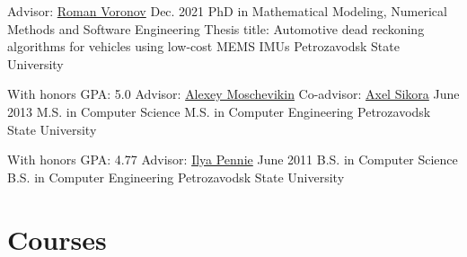 \documentclass{tccv}
\begin{document}
\begin{yearlist}

\item[Advisor: \href{https://petrsu.ru/persons/322/voronov}{Roman Voronov}]{Dec. 2021}
     {PhD \textnormal{in Mathematical Modeling, Numerical Methods and Software Engineering} \newline Thesis title: \textnormal{Automotive dead reckoning algorithms for vehicles using low-cost MEMS IMUs}}
     {Petrozavodsk State University}
     

\item[With honors \newline GPA: 5.0 \newline
      Advisor: \href{http://lab127.karelia.ru/~alexmou/resume_alexmou_eng.pdf}{Alexey Moschevikin} \newline
      Co-advisor: \href{https://ei.hs-offenburg.de/nc/ansprechpartner/personen-details-lsf-cache/lsf/704/6/1127/} {Axel Sikora}]{June 2013}
     {M.S. in Computer Science 
      \newline 
      M.S. in Computer Engineering}
     {Petrozavodsk State University}
\end{yearlist}
\begin{yearlist}
\item[With honors \newline GPA: 4.77 \newline
      Advisor: \href{http://openbudgetrf.ru/sotrudnik-publications/4/}{Ilya Pennie}]{June 2011}
     {B.S. in Computer Science 
      \newline 
      B.S. in Computer Engineering}
     {Petrozavodsk State University}

\end{yearlist}

\section{Courses}
\end{document}
